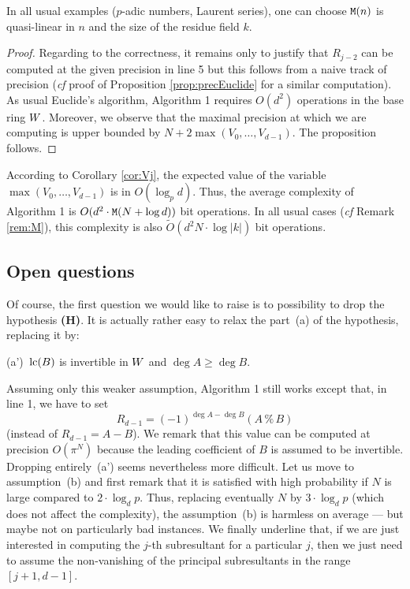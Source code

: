 \documentclass{article}
\begin{document}
\begin{rem}
\label{rem:M}
In all usual examples ($p$-adic numbers, Laurent series), one can 
choose $\text{\tt M}(n)$ is quasi-linear in $n$ and the size of the residue
field $k$.
\end{rem}

\begin{proof}
Regarding to the correctness, it remains only to justify that $R_{j-2}$ 
can be computed at the given precision in line 5 but this follows 
from a naive track of precision (\emph{cf} proof of Proposition
\ref{prop:precEuclide} for a similar computation).
As usual Euclide's algorithm, Algorithm 1 requires $O(d^2)$ operations 
in the base ring $W$. Moreover, we observe that the maximal precision 
at which we are computing is upper bounded by $N + 2 \max(V_0, \ldots, 
V_{d-1})$. The proposition follows.
\end{proof}

According to Corollary \ref{cor:Vj}, the expected value of the variable 
$\max(V_0, \ldots, V_{d-1})$ is in $O(\log_p d)$. Thus, the average 
complexity of Algorithm 1 is $O(d^2 \cdot \text{\tt M}(N + \log d))$ bit 
operations. In all usual cases (\emph{cf} Remark \ref{rem:M}), this
complexity is also $\tilde O(d^2 N \cdot \log |k|)$ bit operations.

\subsection{Open questions}
\label{subsec:questions}

Of course, the first question we would like to raise is to possibility 
to drop the hypothesis {\bf (H)}. It is actually rather easy to relax
the part~(a) of the hypothesis, replacing it by:

\medskip

(a')~$\text{\rm lc}(B)$ is invertible in $W$ and $\deg A \geq \deg B$.

\medskip

\noindent
Assuming only this weaker assumption, Algorithm 1 still works except 
that, in line 1, we have to set
$$R_{d-1} = (-1)^{\deg A - \deg B} (A \,\%\, B)$$
(instead of $R_{d-1} = A-B$).
We remark that this value can be computed at precision $O(\pi^N)$
because the leading coefficient of $B$ is assumed to be invertible.
Dropping entirely~(a') seems nevertheless more difficult. Let us 
move to assumption~(b) and first remark that it is satisfied with high 
probability if $N$ is large compared to $2 \cdot \log_d p$. Thus, 
replacing eventually $N$ by $3 \cdot \log_d p$ (which does not affect 
the complexity), the assumption~(b) is harmless on average --- but maybe
not on particularly bad instances. We finally underline that, if we are
just interested in computing the $j$-th subresultant for a particular
$j$, then we just need to assume the non-vanishing of the principal
subresultants in the range $[j{+}1, d{-}1]$.
\end{document}
